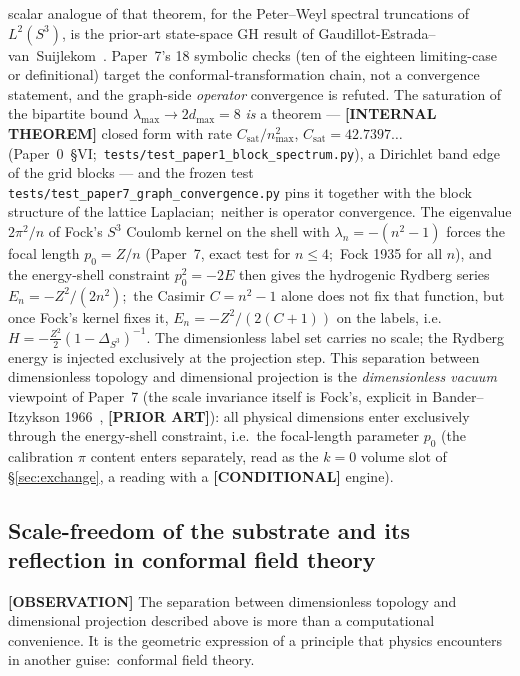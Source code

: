 \documentclass[aps,pra,twocolumn,superscriptaddress,longbibliography]{revtex4-2}
\newcommand{\gvq}[2]{#2}
\newcommand{\gvc}[2]{#2}
\begin{document}
scalar analogue of that theorem, for the Peter--Weyl spectral
truncations of $L^2(S^3)$, is the prior-art state-space GH result of
Gaudillot-Estrada--van~Suijlekom~\cite{gaudillot_vs2025}.  \gvc{paper7-symbolic-checks}{Paper~7's
18 symbolic checks (ten of the eighteen limiting-case or definitional) target the
conformal-transformation chain, not a convergence statement, and the
graph-side \emph{operator} convergence is refuted}. The
saturation of the bipartite bound $\lambda_{\max} \to 2 d_{\max} = 8$
\emph{is} a theorem --- \textbf{[INTERNAL THEOREM]} closed form with rate
$C_{\mathrm{sat}}/n_{\max}^2$, $C_{\mathrm{sat}} = \gvq{saturation_c}{42.7397}\ldots$ (Paper~0~\S VI;\
\texttt{tests/test\_paper1\_block\_spectrum.py}), a
Dirichlet band edge of the grid blocks --- and the frozen
test \texttt{tests/test\_paper7\_graph\_convergence.py} pins it together
with the block structure of the lattice Laplacian;\ neither is operator
convergence.
The eigenvalue $2\pi^2/n$ of Fock's $S^3$ Coulomb kernel on the
shell with $\lambda_n = -(n^2 - 1)$ forces the focal length
$p_0 = Z/n$ (Paper~7, exact test for $n \le 4$;\ Fock 1935 for all
$n$), and the energy-shell constraint $p_0^2 = -2E$ then gives the
hydrogenic Rydberg series $E_n = -Z^2 / (2 n^2)$;\ the Casimir
$C = n^2 - 1$ alone does not fix that function, but once Fock's kernel
fixes it, $E_n = -Z^2/(2(C+1))$ on the labels, i.e.\
$H = -\tfrac{Z^2}{2}(1-\Delta_{S^3})^{-1}$.  The dimensionless label set carries no scale;
the Rydberg energy is injected exclusively at the projection step.  This
separation between dimensionless topology and dimensional projection
is the \emph{dimensionless vacuum} viewpoint of Paper~7 (the scale
invariance itself is Fock's, explicit in Bander--Itzykson
1966~\cite{bander_itzykson1966},
\textbf{[PRIOR ART]}): all physical
dimensions enter exclusively through the energy-shell constraint, i.e.\
the focal-length parameter $p_0$ (the calibration $\pi$ content enters
separately, read as the $k = 0$ volume slot of \S\ref{sec:exchange}, a
reading with a \textbf{[CONDITIONAL]} engine).

\subsection*{Scale-freedom of the substrate and its reflection in conformal field theory}
\label{sec:cft_reflection}

\textbf{[OBSERVATION]} The separation between dimensionless topology and dimensional projection
described above is more than a computational convenience.  It is the
geometric expression of a principle that physics encounters in another
guise:\ conformal field theory.
\end{document}

